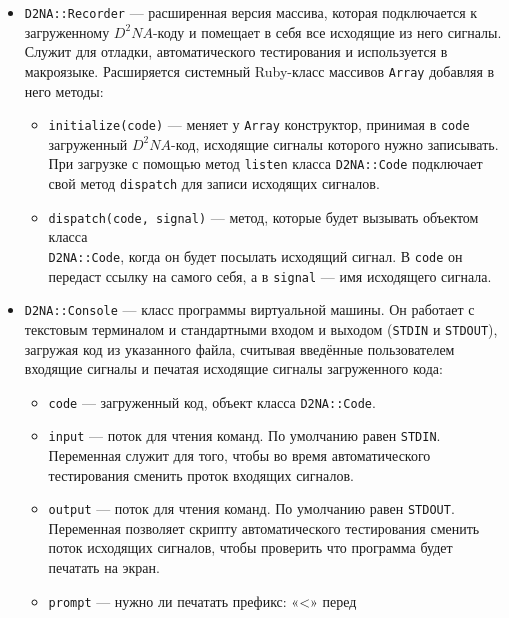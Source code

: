 \documentclass[utf8,a5paper,portrait,10pt,twoside]{eskdtext}
\begin{document}
\begin{itemize}
  \item \texttt{D2NA::Recorder} — расширенная версия массива, которая
        подключается к загруженному $D^2NA$-коду и помещает в себя все
        исходящие из него сигналы. Служит для отладки, автоматического
        тестирования и используется в макроязыке. Расширяется системный
        Ruby-класс массивов \texttt{Array} добавляя в него методы:
       \begin{itemize}
          \item \texttt{initialize(code)} — меняет у \texttt{Array}
                конструктор, принимая в \texttt{code} загруженный $D^2NA$-код,
                исходящие сигналы которого нужно записывать. При загрузке
                с помощью метод \texttt{listen} класса \texttt{D2NA::Code}
                подключает свой метод \texttt{dispatch} для записи исходящих
                сигналов.
          \item \texttt{dispatch(code, signal)} — метод, которые будет вызывать
                объектом класса \\ \texttt{D2NA::Code}, когда он будет посылать
                исходящий сигнал. В \texttt{code} он передаст ссылку на самого
                себя, а в \texttt{signal} — имя исходящего сигнала.
        \end{itemize}
  \item \texttt{D2NA::Console} — класс программы виртуальной машины. Он
        работает с текстовым терминалом и стандартными входом и выходом
        (\texttt{STDIN} и \texttt{STDOUT}), загружая код из указанного файла,
        считывая введённые пользователем входящие сигналы и печатая исходящие
        сигналы загруженного кода:
        \begin{itemize}
          \item \texttt{code} — загруженный код, объект класса
                \texttt{D2NA::Code}.
          \item \texttt{input} — поток для чтения команд. По умолчанию равен
                \texttt{STDIN}. Переменная служит для того, чтобы во время
                автоматического тестирования сменить проток входящих сигналов.
          \item \texttt{output} — поток для чтения команд. По умолчанию равен
                \texttt{STDOUT}. Переменная позволяет скрипту автоматического
                тестирования сменить поток исходящих сигналов, чтобы проверить
                что программа будет печатать на экран.
          \item \texttt{prompt} — нужно ли печатать префикс: «<» перед

\end{itemize}
\end{itemize}
\end{document}
